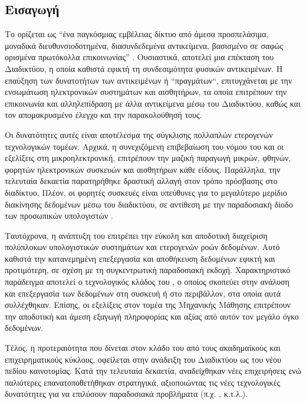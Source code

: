 \subsection{Εισαγωγή}
Το  ορίζεται ως ``ένα παγκόσμιας εμβέλειας δίκτυο από άμεσα προσπελάσιμα, μοναδικά διευθυνσιοδοτημένα, διασυνδεδεμένα αντικείμενα, βασισμένο σε σαφώς ορισμένα πρωτόκολλα επικοινωνίας'' \cite{ATZORI20102787}.
Ουσιαστικά, αποτελεί μια επέκταση του Διαδικτύου, η οποία καθιστά εφικτή τη συνδεσιμότητα φυσικών αντικειμένων.
Η επαύξηση των δυνατοτήτων των αντικειμένων ή ``πραγμάτων``, επιτυγχάνεται με την ενσωμάτωση ηλεκτρονικών συστημάτων και αισθητήρων, τα οποία επιτρέπουν την επικοινωνία και αλληλεπίδραση με άλλα αντικείμενα μέσω του Διαδικτύου, καθώς και τον απομακρυσμένο έλεγχο και την παρακολούθησή τους.
\par
Οι δυνατότητες αυτές είναι αποτέλεσμα της σύγκλισης πολλαπλών ετερογενών τεχνολογικών τομέων.
Αρχικά, η συνεχιζόμενη επιβεβαίωση του νόμου του  και οι εξελίξεις στη μικροηλεκτρονική, επιτρέπουν την μαζική παραγωγή μικρών, φθηνών, φορητών ηλεκτρονικών συσκευών και αισθητήρων κάθε είδους.
Παράλληλα, την τελευταία δεκαετία παρατηρήθηκε δραστική αλλαγή στον τρόπο πρόσβασης στο διαδίκτυο.
Πλέον, οι φορητές συσκευές είναι υπεύθυνες για το μεγαλύτερο μερίδιο διακίνησης δεδομένων μέσω του διαδικτύου, σε αντίθεση με την παραδοσιακή δίοδο των προσωπικών υπολογιστών \cite{cisco2019}.
\par
Ταυτόχρονα, η ανάπτυξη του  επιτρέπει την εύκολη και αποδοτική διαχείριση πολύπλοκων υπολογιστικών συστημάτων και ετερογενών ροών δεδομένων.
Αυτό καθιστά την κατανεμημένη επεξεργασία και αποθήκευση δεδομένων εφικτή και προτιμότερη, σε σχέση με τη συγκεντρωτική παραδοσιακή εκδοχή.
Χαρακτηριστικό παράδειγμα αποτελεί ο τεχνολογικός κλάδος του , ο οποίος σκοπεύει στην ανάλυση και επεξεργασία των δεδομένων στη συσκευή ή στο περιβάλλον, στα οποία αυτά συλλέχθηκαν.
Επίσης, οι εξελίξεις στον τομέα της Μηχανικής Μάθησης επιτρέπουν την αποδοτική και άμεση εξαγωγή πληροφορίας και αξίας από αυτόν τον μεγάλο όγκο δεδομένων.
\par
Τέλος, η προτεραιότητα που δίνεται στον κλάδο του  από τους ακαδημαϊκούς και επιχειρηματικούς κύκλους, οφείλεται στην ανάδειξη του Διαδικτύου ως του νέου πεδίου καινοτομίας.
Κατά την τελευταία δεκαετία, αναδείχθηκαν νέες επιχειρήσεις ενώ παλιότερες επανατοποθετήθηκαν στρατηγικά, αξιοποιώντας τις νέες τεχνολογικές δυνατότητες για να επιλύσουν παραδοσιακά προβλήματα (π.χ. , κ.τ.λ.).

